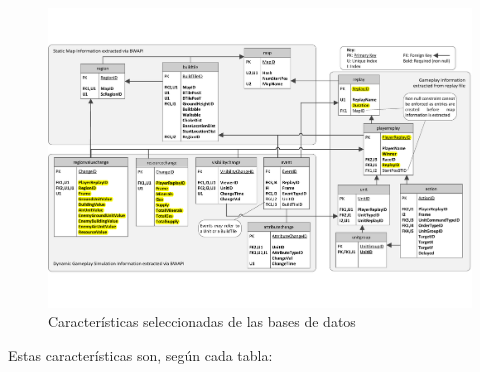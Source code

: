 \documentclass[a4paper,11pt]{book}\usepackage[]{graphicx}\usepackage[]{color}
\makeatletter
\def\maxwidth{ %
  \ifdim\Gin@nat@width>\linewidth
    \linewidth
  \else
    \Gin@nat@width
  \fi
}
\theoremstyle{plain}
\theoremstyle{definition}
\makeatother
\begin{document}
\begin{figure}
    \centering
    \includegraphics[width=\maxwidth]{figure/Robertson14DatabaseDiagramSeleccion}
    \caption{Características seleccionadas de las bases de datos}
    \label{datasetSeleccionado}
\end{figure}


Estas características son, según cada tabla:
\end{document}
